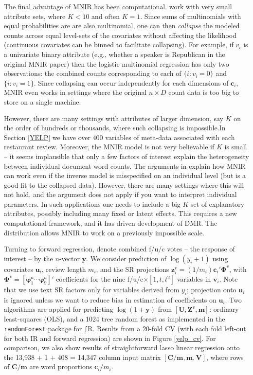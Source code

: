 \documentclass[12pt]{article}
\newcommand{\bs}[1]{\boldsymbol{#1}}
\newcommand{\bm}[1]{\mathbf{#1}}
\newcommand{\cd}[1]{{\tt#1}}
\begin{document}
The final advantage of MNIR has been computational.
\cite{taddy_multinomial_2013,taddy_measuring_2013} work with very small
attribute sets, where $K<10$ and often $K=1$.  Since sums of multinomials with
equal probabilities are are also multinomial, one can then {\it collapse} the
modeled counts across equal level-sets of the covariates without affecting the
likelihood (continuous covariates can be binned to facilitate collapsing).
For example, if $v_i$ is a univariate binary attribute (e.g., whether a
speaker is Republican in the original MNIR paper) then the logistic multinomial regression
  has only two observations: the combined counts
corresponding to each of $\{i:v_i=0\}$ and $\{i:v_i=1\}$. Since collapsing can
occur independently for each dimensions of $\bm{c}_i$,  MNIR  even
works in settings where the original $n\times D$ count data is too big to
store on a single machine.

However, there are many settings with attributes of  larger dimension, say $K$
on the order of hundreds or thousands, where such collapsing is impossible.In
Section \ref{YELP} we have over 400 variables of meta-data associated with
each restaurant review.  Moreover,  the MNIR model is not very believable if
$K$ is small -- it seems implausible that only a few factors of interest
explain the heterogeneity between individual document word counts. The
arguments in \cite{taddy_multinomial_2013,taddy_rejoinder:_2013} explain how
MNIR can work even if the inverse model is misspecified on an individual level
(but is a good fit to the collapsed data).  However, there are many settings
where this will not hold, and the argument does not apply if you want to
interpret individual parameters. In such applications one needs to
include a big-$K$ set of explanatory attributes, possibly including many fixed
or latent effects.   This requires a new computational framework, and it has
driven development of DMR.  The distribution allows MNIR to work on a
previously impossible scale.

Turning to forward regression, denote combined f/u/c votes -- the response of
interest -- by the $n$-vector $\bm{y}$. We consider prediction of
$\log(y_i+1)$ using covariates $\bm{u}_i$, review length $m_i$, and the SR
projections $\bm{z}_i^v = (1/m_i)\bm{c}_i'\bs{\Phi}^v$, with $\bs{\Phi}^v =
[\bs{\varphi}^a_1 \cdots \bs{\varphi}^a_9]'$  coefficients for the nine
f/u/c$\times [1,t,t^2]$ variables in $\bm{v}_i$.  Note that we use text SR
factors only for variables derived from $y_i$; projection onto $\bm{u}_i$ is
ignored unless we want to reduce bias in estimation of
coefficients on  $\bm{u}_i$. Two algorithms are applied for predicting
$\log(1+\bm{y})$ from $[\bm{U},\bm{Z}^v,\bm{m}]$: ordinary least-squares (OLS), and
a 1024 tree random forest \citep[RF;][]{breiman_random_2001} as implemented in the
\cd{randomForest} package for \cd∫{R}. Results from a 20-fold CV (with each fold left-out for both IR and forward regression)
are shown in Figure \ref{yelp_cv}.  For comparison, we also
show results of straightforward lasso linear regression onto the 13,938 + 1 +
408 =  14,347 column input matrix $[\bm{C}/\bm{m},\bm{m},\bm{V}]$, where
rows of $\bm{C}/\bm{m}$ are word proportions $\bm{c}_i/m_i$.
\end{document}

